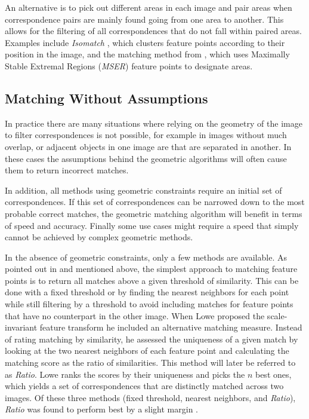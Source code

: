 An alternative is to pick out different areas in each image and pair 
areas when correspondence pairs are mainly found going from one area to 
another. This allows for the filtering of all correspondences that do 
not fall within paired areas. Examples include \emph{Isomatch} 
\cite{das2008event}, which clusters feature points according to their 
position in the image, and the matching method from \cite{wu2011robust}, 
which uses Maximally Stable Extremal Regions (\emph{MSER}) feature 
points to designate areas. 

\subsection{Matching Without Assumptions}

In practice there are many situations where relying on the geometry of 
the image to filter correspondences is not possible, for example in 
images without much overlap, or adjacent objects in one image are that 
are separated in another. In these cases the assumptions behind the 
geometric algorithms will often cause them to return incorrect matches.  

In addition, all methods using geometric constraints require an initial 
set of correspondences. If this set of correspondences can be narrowed 
down to the most probable correct matches, the geometric matching 
algorithm will benefit in terms of speed and accuracy.  Finally some use 
cases might require a speed that simply cannot be achieved by complex 
geometric methods.

In the absence of geometric constraints, only a few methods are 
available.  As pointed out in \cite{szeliski2010} and mentioned above, 
the simplest approach to matching feature points is to return all 
matches above a given threshold of similarity.  This can be done with a 
fixed threshold or by finding the nearest neighbors for each point while 
still filtering by a threshold to avoid including matches for feature 
points that have no counterpart in the other image.  When Lowe 
\cite{lowe2004sift} proposed the scale-invariant feature transform he 
included an alternative matching measure. Instead of rating matching by 
similarity, he assessed the uniqueness of a given match by looking at 
the two nearest neighbors of each feature point and calculating the 
matching score as the ratio of similarities. This method will later be 
referred to as \emph{Ratio}.  Lowe ranks the scores by their uniqueness 
and picks the $n$ best ones, which yields a set of correspondences that 
are distinctly matched across two images.  Of these three methods (fixed 
threshold, nearest neighbors, and \emph{Ratio}), \emph{Ratio} was found 
to perform best by a slight margin \cite{mikolajczyk2005performance}.

